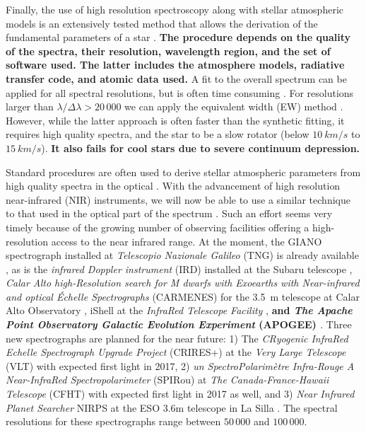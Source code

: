 \documentclass{aa}
\begin{document}
Finally, the use of high resolution spectroscopy along with stellar atmospheric
models is an extensively tested method that allows the derivation of the
fundamental parameters of a star \citep[see e.g.][]{Valenti2005,Santos13}. {\bf
The procedure depends on the quality of the spectra, their resolution,
wavelength region, and the set of software used. The latter includes the
atmosphere models, radiative transfer code, and atomic data used.} A fit to the
overall spectrum can be applied for all spectral resolutions, but is often time
consuming \citep[see e.g.][]{Recio2006,Tsantaki2014}. For resolutions larger
than $\lambda/\Delta\lambda > 20\,000$ we can apply the equivalent width (EW)
method \citep[see e.g.][for details]{Tsantaki2013,Andreasen2017a}. However,
while the latter approach is often faster than the synthetic fitting, it
requires high quality spectra, and the star to be a slow rotator (below
$\SI{10}{km/s}$ to $\SI{15}{km/s}$). {\bf It also fails for cool stars due to
severe continuum depression.}

Standard procedures are often used to derive stellar atmospheric parameters from
high quality spectra in the optical \citep[see e.g.][]{Valenti2005,Sousa2008a}.
With the advancement of high resolution near-infrared (NIR) instruments, we will
now be able to use a similar technique to that used in the optical part of the
spectrum \citep[see e.g.][]{Melendez1999,Sousa2008a,Tsantaki2013,Mucciarelli2013,Bensby2014}.
Such an effort seems very timely because of the growing number of observing
facilities offering a high-resolution access to the near infrared range.
At the moment, the GIANO spectrograph installed at \emph{Telescopio Nazionale
Galileo} (TNG) is already available \citep{GIANO}, as is the \emph{infrared
Doppler instrument} (IRD) installed at the Subaru telescope \citep{IRD},
\emph{Calar Alto high-Resolution search for M dwarfs with Exoearths with
Near-infrared and optical Échelle Spectrographs} (CARMENES) for the \SI{3.5}{m}
telescope at Calar Alto Observatory \citep{CARMENES}, iShell at the
\emph{InfraRed Telescope Facility} \citep{ishell1,ishell2}, {\bf and \emph{The
Apache Point Observatory Galactic Evolution Experiment} (APOGEE) \citep{APOGEE}}.
Three new spectrographs are planned for the near future: 1) The \emph{CRyogenic
InfraRed Echelle Spectrograph Upgrade Project} (CRIRES+) at the \emph{Very Large
Telescope} (VLT) \citep{CRIRESp} with expected first light in 2017, 2) \emph{un
SpectroPolarimètre Infra-Rouge A Near-InfraRed Spectropolarimeter} (SPIRou) at
\emph{The Canada-France-Hawaii Telescope} (CFHT) \citep{SPIROU1,SPIROU2} with
expected first light in 2017 as well, and 3) \emph{Near Infrared Planet
Searcher} NIRPS at the ESO 3.6m telescope in La Silla \citep{NIRPS}. The
spectral resolutions for these spectrographs range between $50\,000$ and
$100\,000$.
\end{document}
